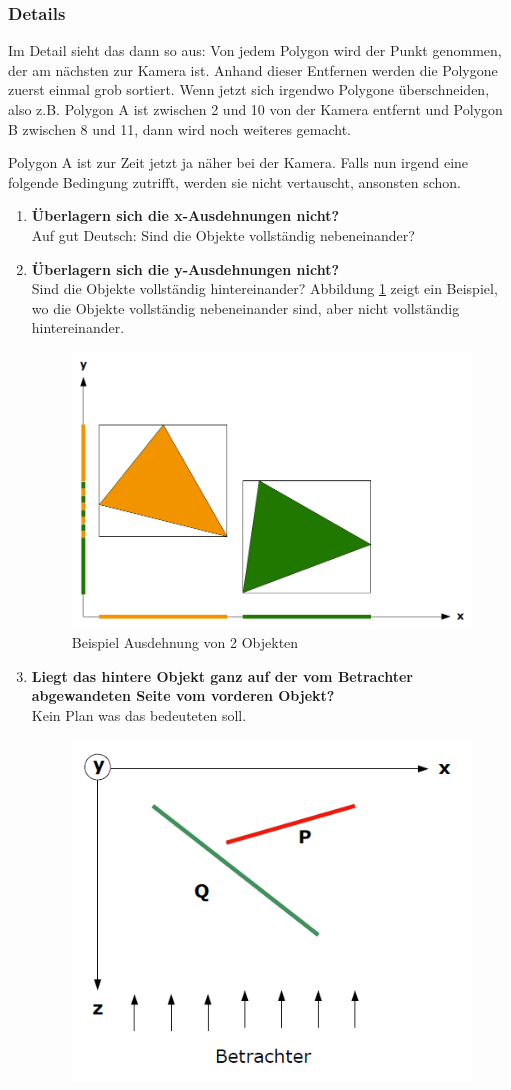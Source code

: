 \subsubsection{Details}
Im Detail sieht das dann so aus:
Von jedem Polygon wird der Punkt genommen, der am nächsten zur Kamera ist. Anhand dieser Entfernen werden die Polygone zuerst einmal grob sortiert. Wenn jetzt sich irgendwo Polygone überschneiden, also z.B. Polygon A ist zwischen 2 und 10 von der Kamera entfernt und Polygon B zwischen 8 und 11, dann wird noch weiteres gemacht.

Polygon A ist zur Zeit jetzt ja näher bei der Kamera. Falls nun irgend eine folgende Bedingung zutrifft, werden sie nicht vertauscht, ansonsten schon.

\begin{enumerate}
	\item \textbf{Überlagern sich die x-Ausdehnungen nicht?} \\
	Auf gut Deutsch: Sind die Objekte vollständig nebeneinander?
	\item \textbf{Überlagern sich die y-Ausdehnungen nicht?} \\
	Sind die Objekte vollständig hintereinander? Abbildung \ref{fig:ausdehnungen} zeigt ein Beispiel, wo die Objekte vollständig nebeneinander sind, aber nicht vollständig hintereinander.
		\begin{figure}[!ht]
			\centering
			\includegraphics[width=0.5\linewidth]{fig/ausdehnungen}
			\caption{Beispiel Ausdehnung von 2 Objekten}
			\label{fig:ausdehnungen}
		\end{figure}
	\item \textbf{Liegt das hintere Objekt ganz auf der vom Betrachter abgewandeten Seite vom vorderen Objekt?} \\
	Kein Plan was das bedeuteten soll.
		\begin{figure}[!ht]
			\centering
			\includegraphics[width=0.5\linewidth]{fig/tiefensortierung_3}

\end{figure}
\end{enumerate}
